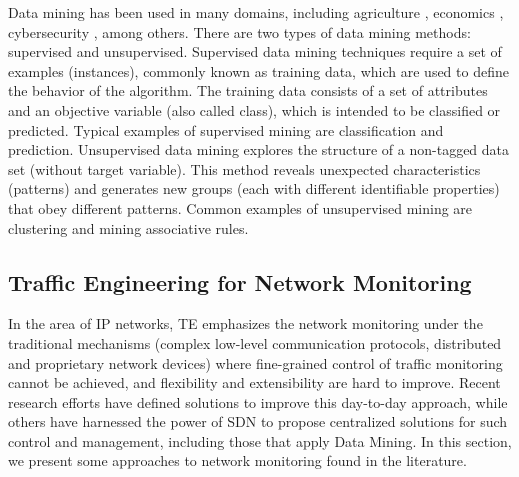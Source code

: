 
Data mining has been used in many domains, including agriculture \cite{efcastillo_2016:agriculture, efcastillo_2015:agriculture, ZHANG_2005:agriculture}, economics \cite{kim_2004:usefulness, nielsen_2004:local}, cybersecurity \cite{Dua_2011:DM_ML_Cybersecurity, Thuraisingham_2003:ciber}, among others. There are two types of data mining methods: supervised and unsupervised. Supervised data mining techniques require a set of examples (instances), commonly known as training data, which are used to define the behavior of the algorithm. The training data consists of a set of attributes and an objective variable (also called class), which is intended to be classified or predicted. Typical examples of supervised mining are classification and prediction. Unsupervised data mining explores the structure of a non-tagged data set (without target variable). This method reveals unexpected characteristics (patterns) and generates new groups (each with different identifiable properties) that obey different patterns. Common examples of unsupervised mining are clustering and mining associative rules.

\subsection{Traffic Engineering for Network Monitoring}
\label{sub:te_in_monitoring}
In the area of IP networks, TE emphasizes the network monitoring under the traditional mechanisms (complex low-level communication protocols, distributed and proprietary network devices) where fine-grained control of traffic monitoring cannot be achieved, and flexibility and extensibility are hard to improve. Recent research efforts have defined solutions to improve this day-to-day approach, while others have harnessed the power of SDN to propose centralized solutions for such control and management, including those that apply Data Mining. In this section, we present some approaches to network monitoring found in the literature.

